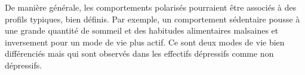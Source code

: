 De manière générale, les comportements polarisés pourraient être associés à des profils typiques, bien définis. Par exemple, un comportement sédentaire pousse à une grande quantité de sommeil et des habitudes alimentaires malsaines et inversement pour un mode de vie plus actif. Ce sont deux modes de vie bien différenciés mais qui sont observés dans les effectifs dépressifs comme non dépressifs.
